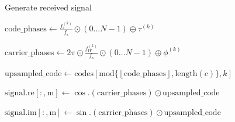 \documentclass{juliacon}
\begin{document}
\begin{algorithm}[b]
    \caption{\label{alg:gen-signal} Generate received signal}
    
    \begin{algorithmic}[1]
        \vspace{1mm}
            \vspace{1mm}
                    \vspace{1mm}
                    \State $\mathrm{code\_phases} \gets \frac{f^{(k)}_{\mathrm{c}}}{f_{\mathrm{s}} } \odot (0 \dots N - 1) \oplus \tau^{(k)}$
                    \vspace{1mm}

                    \State $\mathrm{carrier\_phases} \gets 2\pi \odot \frac{f^{(k)}_{\mathrm{IF}}}{f_{\mathrm{s}}} \odot (0 \dots N - 1) \oplus \phi^{(k)}$
                    \vspace{1mm}

                    \State $\mathrm{upsampled\_code} \gets \mathrm{codes}[\mathrm{mod}\{\left\lfloor \mathrm{code\_phases} \right\rfloor, \mathrm{length}(c)\},k]$
                    \vspace{2mm}
                    
                    \State $\mathrm{signal.re[:, m]} \gets \cos .(\mathrm{carrier\_phases}) \odot \mathrm{upsampled\_code}$
                    \vspace{1mm}

                    \State $\mathrm{signal.im[:, m]} \gets \sin .(\mathrm{carrier\_phases}) \odot \mathrm{upsampled\_code}$
                    \vspace{1mm}
                \EndFor
            \EndFor
            \vspace{1mm}
        \EndProcedure
    \end{algorithmic}
\end{algorithm}
\end{document}
